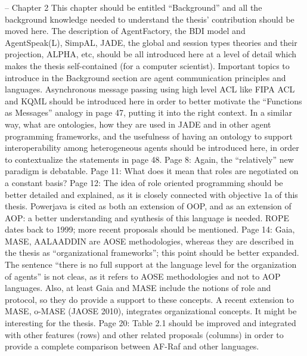 \documentclass{article}
\newenvironment{them}{\noindent\begingroup\color{blue}}{\endgroup\par}
\begin{document}
\begin{them}
-- Chapter 2
This chapter should be entitled “Background” and all the background knowledge needed to
understand the thesis' contribution should be moved here. The description of AgentFactory, the BDI
model and AgentSpeak(L), SimpAL, JADE, the global and session types theories and their projection,
ALPHA, etc, should be all introduced here at a level of detail which makes the thesis self-contained
(for a computer scientist).
Important topics to introduce in the Background section are agent communication principles and
languages. Asynchronous message passing using high level ACL like FIPA ACL and KQML should be
introduced here in order to better motivate the “Functions as Messages” analogy in page 47, putting
it into the right context.
In a similar way, what are ontologies, how they are used in JADE and in other agent programming
frameworks, and the usefulness of having an ontology to support interoperability among
heterogeneous agents should be introduced here, in order to contextualize the statements in page
48.
Page 8:
Again, the “relatively” new paradigm is debatable.
Page 11:
What does it mean that roles are negotiated on a constant basis?
Page 12:
The idea of role oriented programming should be better detailed and explained, as it is closely
connected with objective 1a of this thesis. Powerjava is cited as both an extension of OOP, and as an
extension of AOP: a better understanding and synthesis of this language is needed. ROPE dates back
to 1999; more recent proposals should be mentioned.
Page 14:
Gaia, MASE, AALAADDIN are AOSE methodologies, whereas they are described in the thesis as
“organizational frameworks”; this point should be better expanded.
The sentence “there is no full support at the language level for the organization of agents” is not
cleas, as it refers to AOSE methodologies and not to AOP languages. Also, at least Gaia and MASE
include the notions of role and protocol, so they do provide a support to these concepts. A recent
extension to MASE, o-MASE (JAOSE 2010), integrates organizational concepts. It might be interesting
for the thesis.
Page 20:
Table 2.1 should be improved and integrated with other features (rows) and other related proposals
(columns) in order to provide a complete comparison between AF-Raf and other languages.
\end{them}
\end{document}
